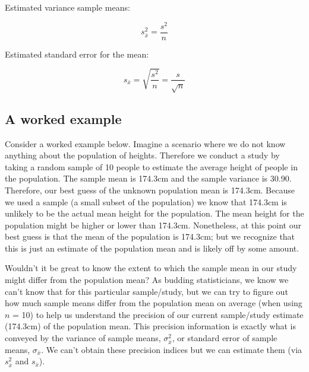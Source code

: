 \documentclass[
]{krantz}
\begin{document}
Estimated variance sample means:

\begin{equation} 
s_{\bar{x}}^2 = \frac{s^2}{n}
      \label{eq:samplevar2estchnext}
\end{equation}

Estimated standard error for the mean:

\begin{equation} 
s_{\bar{x}} = \sqrt{\frac{s^2}{n}} = \frac{s}{{\sqrt{n}}}
      \label{eq:samplese2estchnext}
\end{equation}

\hypertarget{a-worked-example}{%
\subsection{A worked example}\label{a-worked-example}}

Consider a worked example below. Imagine a scenario where we do not know anything about the population of heights. Therefore we conduct a study by taking a random sample of 10 people to estimate the average height of people in the population. The sample mean is 174.3cm and the sample variance is 30.90. Therefore, our best guess of the unknown population mean is 174.3cm. Because we used a sample (a small subset of the population) we know that 174.3cm is unlikely to be the actual mean height for the population. The mean height for the population might be higher or lower than 174.3cm. Nonetheless, at this point our best guess is that the mean of the population is 174.3cm; but we recognize that this is just an estimate of the population mean and is likely off by some amount.

Wouldn't it be great to know the extent to which the sample mean in our study might differ from the population mean? As budding statisticians, we know we can't know that for this particular sample/study, but we can try to figure out how much sample means differ from the population mean on average (when using \(n\) = 10) to help us understand the precision of our current sample/study estimate (174.3cm) of the population mean. This precision information is exactly what is conveyed by the variance of sample means, \(\sigma_{\bar{x}}^2\), or standard error of sample means, \(\sigma_{\bar{x}}\). We can't obtain these precision indices but we can estimate them (via \(s_{\bar{x}}^2\) and \(s_{\bar{x}}\)).
\end{document}
